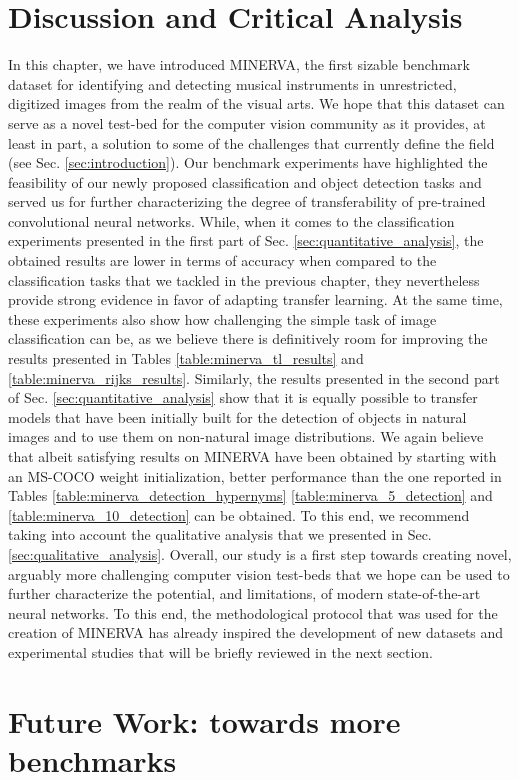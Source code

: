 \section{Discussion and Critical Analysis}
\label{sec:discussion}
In this chapter, we have introduced MINERVA, the first sizable benchmark dataset for identifying and detecting musical instruments in unrestricted, digitized images from the realm of the visual arts. We hope that this dataset can serve as a novel test-bed for the computer vision community as it provides, at least in part, a solution to some of the challenges that currently define the field (see Sec. \ref{sec:introduction}). Our benchmark experiments have highlighted the feasibility of our newly proposed classification and object detection tasks and served us for further characterizing the degree of transferability of pre-trained convolutional neural networks. While, when it comes to the classification experiments presented in the first part of Sec. \ref{sec:quantitative_analysis}, the obtained results are lower in terms of accuracy when compared to the classification tasks that we tackled in the previous chapter, they nevertheless provide strong evidence in favor of adapting transfer learning. At the same time, these experiments also show how challenging the simple task of image classification can be, as we believe there is definitively room for improving the results presented in Tables \ref{table:minerva_tl_results} and \ref{table:minerva_rijks_results}. Similarly, the results presented in the second part of Sec. \ref{sec:quantitative_analysis} show that it is equally possible to transfer models that have been initially built for the detection of objects in natural images and to use them on non-natural image distributions. We again believe that albeit satisfying results on MINERVA have been obtained by starting with an MS-COCO weight initialization, better performance than the one reported in Tables \ref{table:minerva_detection_hypernyms} \ref{table:minerva_5_detection} and \ref{table:minerva_10_detection} can be obtained. To this end, we recommend taking into account the qualitative analysis that we presented in Sec. \ref{sec:qualitative_analysis}. Overall, our study is a first step towards creating novel, arguably more challenging computer vision test-beds that we hope can be used to further characterize the potential, and limitations, of modern state-of-the-art neural networks. To this end, the methodological protocol that was used for the creation of MINERVA has already inspired the development of new datasets and experimental studies that will be briefly reviewed in the next section.

\section{Future Work: towards more benchmarks}
\label{sec:future_work}
